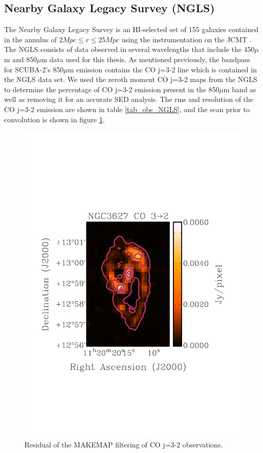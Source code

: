 \subsection{Nearby Galaxy Legacy Survey (NGLS)}

The Nearby Galaxy Legacy Survey is an HI-selected set of 155 galaxies contained in the annulus of $2Mpc\leq r \leq25Mpc$ using the instrumentation on the JCMT \citep{wilson2012}.  The NGLS consists of data observed in several wavelengths that include the 450$\mu$m and 850$\mu$m data used for this thesis.  As mentioned previously, the bandpass for SCUBA-2's 850$\mu$m emission contains the CO j=3-2 line which is contained in the NGLS data set.  We used the zeroth moment CO j=3-2 maps from the NGLS to determine the percentage of CO j=3-2 emission present in the 850$\mu$m band as well as removing it for an accurate SED analysis.  The rms and resolution of the CO j=3-2 emission are shown in table \ref{tab_obs_NGLS}, and the scan prior to convolution is shown in figure \ref{fig_co32}.

\begin{figure}
  \centering
  \label{fig_co32}
  \includegraphics[scale=0.5]{obs_imgs/CO32.jpeg}
  \caption[NGC3627 CO j=3-2 Observations]{Residual of the MAKEMAP filtering of CO j=3-2 observations.}
\end{figure}

